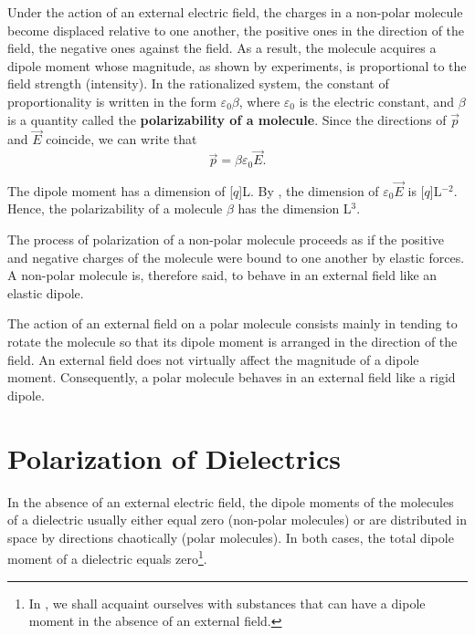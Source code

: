 Under the action of an external electric field, the charges in a non-polar molecule become displaced relative to one another, the positive ones in the direction of the field, the negative ones against the field. As a result, the molecule acquires a dipole moment whose magnitude, as shown by experiments, is proportional to the field strength (intensity). In the rationalized system, the constant of proportionality is written in the form $\varepsilon_0\beta$, where $\varepsilon_0$ is the electric constant, and $\beta$ is a quantity called the \textbf{polarizability of a molecule}. Since the directions of $\vec{p}$ and $\vec{E}$ coincide, we can write that
\begin{equation}\label{eq:2_3}
    \vec{p} = \beta \varepsilon_0 \vec{E}.
\end{equation}

\noindent
The dipole moment has a dimension of [$q$]L. By , the dimension of $\varepsilon_0\vec{E}$ is [$q$]L$^{-2}$. Hence, the polarizability of a molecule $\beta$ has the dimension L$^3$.

The process of polarization of a non-polar molecule proceeds as if the positive and negative charges of the molecule were bound to one another by elastic forces. A non-polar molecule is, therefore said, to behave in an external field like an elastic dipole.

The action of an external field on a polar molecule consists mainly in tending to rotate the molecule so that its dipole moment is arranged in the direction of the field. An external field does not virtually affect the magnitude of a dipole moment. Consequently, a polar molecule behaves in an external field like a rigid dipole.

\section{Polarization of Dielectrics}\label{sec:2_2}

In the absence of an external electric field, the dipole moments of the molecules of a dielectric usually either equal zero (non-polar molecules) or are distributed in space by directions chaotically (polar molecules). In both cases, the total dipole moment of a dielectric equals zero\footnote{In , we shall acquaint ourselves with substances that can have a dipole moment in the absence of an external field.}.

